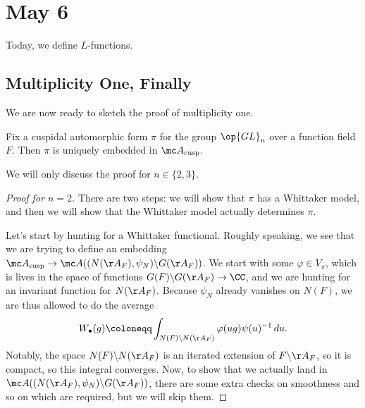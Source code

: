 \documentclass[../notes.tex]{subfiles}
\begin{document}
\section{May 6}
Today, we define $L$-functions.

\subsection{Multiplicity One, Finally}
We are now ready to sketch the proof of multiplicity one.
\begin{theorem}
	Fix a cuspidal automorphic form $\pi$ for the group $\op{GL}_n$ over a function field $F$. Then $\pi$ is uniquely embedded in $\mc A_{\mathrm{cusp}}$.
\end{theorem}
We will only discuss the proof for $n\in\{2,3\}$.
\begin{proof}[Proof for $n=2$]
	There are two steps: we will show that $\pi$ has a Whittaker model, and then we will show that the Whittaker model actually determines $\pi$.

	Let's start by hunting for a Whittaker functional. Roughly speaking, we see that we are trying to define an embedding $\mc A_{\mathrm{cusp}}\to\mc A((N(\AA_F),\psi_N)\backslash G(\AA_F))$. We start with some $\varphi\in V_\pi$, which is lives in the space of functions $G(F)\backslash G(\AA_F)\to\CC$, and we are hunting for an invariant function for $N(\AA_F)$. Because $\psi_N$ already vanishes on $N(F)$, we are thus allowed to do the average
	\[W_\bullet(g)\coloneqq\int_{N(F)\backslash N(\AA_F)}\varphi(ug)\psi(u)^{-1}\,du.\]
	Notably, the space $N(F)\backslash N(\AA_F)$ is an iterated extension of $F\backslash\AA_F$, so it is compact, so this integral converges. Now, to show that we actually land in $\mc A((N(\AA_F),\psi_N)\backslash G(\AA_F))$, there are some extra checks on smoothness and so on which are required, but we will skip them.


\end{proof}
\end{document}
